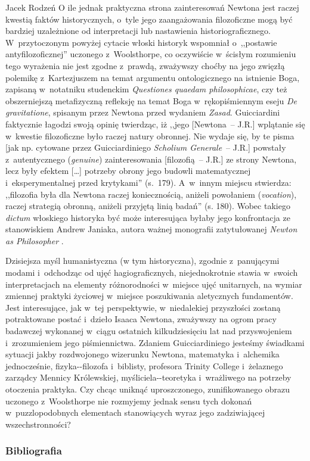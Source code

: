 \begin{recplenv}{Jacek Rodzeń}
O ile jednak praktyczna strona zainteresowań Newtona jest raczej kwestią faktów historycznych, o~tyle jego
zaangażowania filozoficzne mogą być bardziej uzależnione od interpretacji lub nastawienia
historiograficznego. W~przytoczonym powyżej cytacie włoski historyk wspomniał o~,,postawie antyfilozoficznej''
uczonego z~Wools\-thorpe, co
oczywiście w~ścisłym rozumieniu tego wyrażenia nie jest zgodne z~prawdą, zważywszy choćby na jego zwięzłą
polemikę z~Kartezjuszem na temat argumentu ontologicznego na istnienie Boga, zapisaną w~notatniku studenckim
\textit{Questiones
quaedam philosophicae}, czy też obszerniejszą metafizyczną refleksję na temat Boga w~rękopiśmiennym eseju \textit{De
gravitatione}, spisanym przez Newtona przed wydaniem \textit{Zasad}. Guicciardini faktycznie łagodzi swoją opinię
twierdząc, iż ,,jego [Newtona~-- J.R.] wplątanie się w~kwestie filozoficzne było raczej natury obronnej. Nie wydaje się,
by te pisma [jak np. cytowane przez Guicciardiniego \textit{Scholium Generale}~-- J.R.] powstały z~autentycznego
(\textit{genuine}) zainteresowania [filozofią~-- J.R.] ze strony Newtona, lecz były efektem […] potrzeby obrony jego
budowli matematycznej i~eksperymentalnej przed krytykami'' (s.~179). A~w~innym miejscu stwierdza: ,,filozofia była dla
Newtona raczej koniecznością, aniżeli powołaniem (\textit{vocation}), raczej strategią obronną, aniżeli przyjętą linią
badań'' (s. 180). Wobec takiego \textit{dictum} włoskiego historyka być może interesująca byłaby jego konfrontacja ze
stanowiskiem Andrew Janiaka, autora ważnej monografii zatytułowanej
\textit{Newton as Philosopher} \parencite*{janiak_newton_2008}.

Dzisiejsza myśl humanistyczna (w tym historyczna), zgodnie z~panującymi modami i~odchodząc od ujęć hagiograficznych,
niejednokrotnie stawia w~swoich interpretacjach na elementy różnorodności w~miejsce ujęć unitarnych, na wymiar zmiennej
praktyki życiowej w~miejsce poszukiwania aletycznych fundamentów. Jest interesujące, jak w~tej
perspektywie, w~niedalekiej przyszłości zostaną potraktowane postać i~dzieło Isaaca Newtona, zważywszy
na ogrom pracy badawczej
wykonanej w~ciągu ostatnich kilkudziesięciu lat nad przyswojeniem i~zrozumieniem jego piśmiennictwa. Zdaniem
Guicciardiniego jesteśmy świadkami sytuacji jakby rozdwojonego wizerunku Newtona, matematyka i~alchemika jednocześnie,
fizyka-\mbox{-filozofa} %
i~biblisty, profesora Trinity College i~żelaznego zarządcy Mennicy Królewskiej,
myśliciela-\mbox{-teoretyka} %
i~wrażliwego na potrzeby otoczenia praktyka. Czy chcąc uniknąć uproszczonego, zunifikowanego
obrazu uczonego z~Wools\-thorpe nie rozmyjemy jednak sensu tych dokonań w~puzzlopodobnych elementach stanowiących wyraz
jego zadziwiającej wszechstronności? 





\subsubsection{Bibliografia}\nopagebreak[4]
\end{recplenv}
